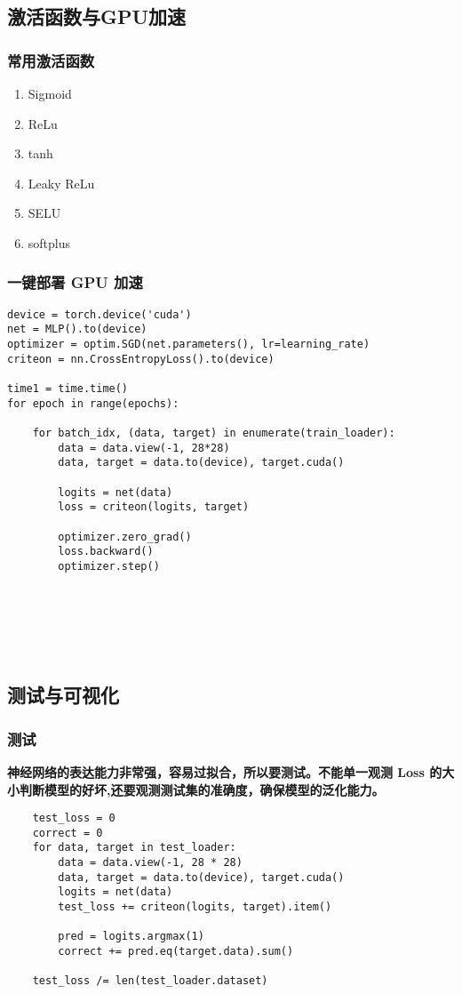 \subsection{激活函数与GPU加速}
\subsubsection{常用激活函数}
\begin{enumerate}
  \item Sigmoid
  \item ReLu
  \item tanh
  \item Leaky ReLu
  \item SELU
  \item softplus
\end{enumerate}
\subsubsection{一键部署 GPU 加速}
\begin{lstlisting}
device = torch.device('cuda')
net = MLP().to(device)
optimizer = optim.SGD(net.parameters(), lr=learning_rate)
criteon = nn.CrossEntropyLoss().to(device)

time1 = time.time()
for epoch in range(epochs):

    for batch_idx, (data, target) in enumerate(train_loader):
        data = data.view(-1, 28*28)
        data, target = data.to(device), target.cuda()

        logits = net(data)
        loss = criteon(logits, target)

        optimizer.zero_grad()
        loss.backward()
        optimizer.step()
\end{lstlisting}
~\\~\\~\\~\\


\subsection{测试与可视化}
\subsubsection{测试}
\textbf{神经网络的表达能力非常强，容易过拟合，所以要测试。不能单一观测  Loss 的大小判断模型的好坏,还要观测测试集的准确度，确保模型的泛化能力。}
\begin{lstlisting}
    test_loss = 0
    correct = 0
    for data, target in test_loader:
        data = data.view(-1, 28 * 28)
        data, target = data.to(device), target.cuda()
        logits = net(data)
        test_loss += criteon(logits, target).item()

        pred = logits.argmax(1)
        correct += pred.eq(target.data).sum()

    test_loss /= len(test_loader.dataset)
\end{lstlisting}

